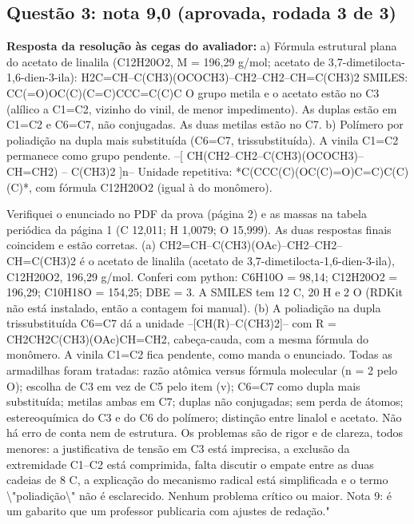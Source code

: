 \documentclass{article}%
\begin{document}
\subsection*{Questão 3: nota 9,0 (aprovada, rodada 3 de 3)}%
\textbf{Resposta da resolução às cegas do avaliador:} a) Fórmula estrutural plana do acetato de linalila (C12H20O2, M = 196,29 g/mol; acetato de 3,7{-}dimetilocta{-}1,6{-}dien{-}3{-}ila):\newline%
\newline%
H2C=CH--C(CH3)(OCOCH3)--CH2--CH2--CH=C(CH3)2\newline%
\newline%
SMILES: CC(=O)OC(C)(C=C)CCC=C(C)C\newline%
\newline%
O grupo metila e o acetato estão no C3 (alílico a C1=C2, vizinho do vinil, de menor impedimento). As duplas estão em C1=C2 e C6=C7, não conjugadas. As duas metilas estão no C7.\newline%
\newline%
b) Polímero por poliadição na dupla mais substituída (C6=C7, trissubstituída). A vinila C1=C2 permanece como grupo pendente.\newline%
\newline%
--{[} CH(CH2--CH2--C(CH3)(OCOCH3)--CH=CH2) -- C(CH3)2 {]}n--\newline%
\newline%
Unidade repetitiva: *C(CCC(C)(OC(C)=O)C=C)C(C)(C)*, com fórmula C12H20O2 (igual à do monômero).\par %
Verifiquei o enunciado no PDF da prova (página 2) e as massas na tabela periódica da página 1 (C 12,011; H 1,0079; O 15,999). As duas respostas finais coincidem e estão corretas. (a) CH2=CH--C(CH3)(OAc)--CH2--CH2--CH=C(CH3)2 é o acetato de linalila (acetato de 3,7{-}dimetilocta{-}1,6{-}dien{-}3{-}ila), C12H20O2, 196,29 g/mol. Conferi com python: C6H10O = 98,14; C12H20O2 = 196,29; C10H18O = 154,25; DBE = 3. A SMILES tem 12 C, 20 H e 2 O (RDKit não está instalado, então a contagem foi manual). (b) A poliadição na dupla trissubstituída C6=C7 dá a unidade --{[}CH(R)--C(CH3)2{]}-- com R = CH2CH2C(CH3)(OAc)CH=CH2, cabeça{-}cauda, com a mesma fórmula do monômero. A vinila C1=C2 fica pendente, como manda o enunciado. Todas as armadilhas foram tratadas: razão atômica versus fórmula molecular (n = 2 pelo O); escolha de C3 em vez de C5 pelo item (v); C6=C7 como dupla mais substituída; metilas ambas em C7; duplas não conjugadas; sem perda de átomos; estereoquímica do C3 e do C6 do polímero; distinção entre linalol e acetato. Não há erro de conta nem de estrutura. Os problemas são de rigor e de clareza, todos menores: a justificativa de tensão em C3 está imprecisa, a exclusão da extremidade C1--C2 está comprimida, falta discutir o empate entre as duas cadeias de 8 C, a explicação do mecanismo radical está simplificada e o termo \textbackslash{}"poliadição\textbackslash{}" não é esclarecido. Nenhum problema crítico ou maior. Nota 9: é um gabarito que um professor publicaria com ajustes de redação."%
\end{document}
